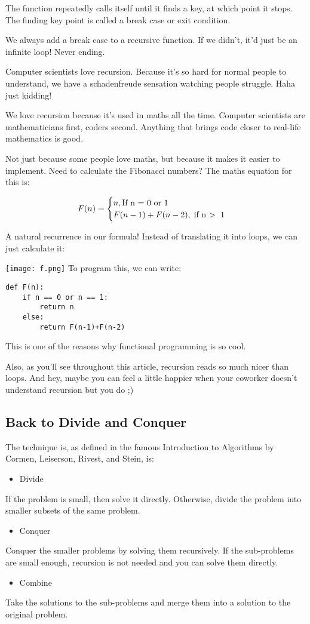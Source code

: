 \documentclass{article}
\begin{document}
The function repeatedly calls itself until it finds a key, at which point it stops. The finding key point is called a break case or exit condition.

We always add a break case to a recursive function. If we didn't, it'd just be an infinite loop! Never ending. 

Computer scientists love recursion. Because it's so hard for normal people to understand, we have a schadenfreude sensation watching people struggle. Haha just kidding!

We love recursion because it's used in maths all the time. Computer scientists are mathematicians first, coders second. Anything that brings code closer to real-life mathematics is good. 

Not just because some people love maths, but because it makes it easier to implement. Need to calculate the Fibonacci numbers? The maths equation for this is:



$$F(n) = \begin{cases} n, \text{If n = 0 or 1} \\ F(n - 1) + F(n - 2), \; \text{if n \textgreater \; 1} \end{cases}$$

A natural recurrence in our formula! Instead of translating it into loops, we can just calculate it:

\texttt{[image: f.png]}
To program this, we can write:
\begin{verbatim}
def F(n):
	if n == 0 or n == 1:
		return n
  	else:
		return F(n-1)+F(n-2)
\end{verbatim}
This is one of the reasons why functional programming is so cool.

Also, as you'll see throughout this article, recursion reads so much nicer than loops. And hey, maybe you can feel a little happier when your coworker doesn't understand recursion but you do ;) 
\newpage
\subsection{Back to Divide and Conquer}
The technique is, as defined in the famous Introduction to Algorithms by Cormen, Leiserson, Rivest, and Stein, is:
\begin{itemize}
    \item Divide
\end{itemize}
If the problem is small, then solve it directly. Otherwise, divide the problem into smaller subsets of the same problem.
\begin{itemize}
    \item Conquer
\end{itemize}
Conquer the smaller problems by solving them recursively. If the sub-problems are small enough, recursion is not needed and you can solve them directly.
\begin{itemize}
    \item Combine
\end{itemize}
Take the solutions to the sub-problems and merge them into a solution to the original problem.
\end{document}
